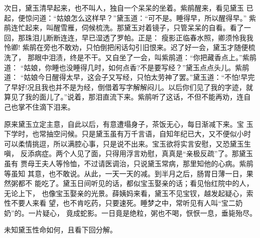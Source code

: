 次日，黛玉清早起来，也不叫人，独自一个呆呆的坐着。紫鹃醒来，看见黛玉
已起，便惊问道：“姑娘怎么这样早？”黛玉道：“可不是。睡得早，所以醒得早。”
紫鹃连忙起来，叫醒雪雁，伺候梳洗。那黛玉对着镜子，只管呆呆的自看。看了一
回，那珠泪儿断断连连，早已湿透了罗帕。正是：
瘦影正临春水照，卿须怜我我怜卿!
紫鹃在旁也不敢劝，只怕倒把闲话勾引旧恨来。迟了好一会，黛玉才随便梳洗了，
那眼中泪渍，终是不干。又自坐了一会，叫紫鹃道：“你把藏香点上。”紫鹃道：
“姑娘，你睡也没睡得几时，如何点香?不是要写经？”黛玉点点头儿。紫鹃道：
“姑娘今日醒得太早，这会子又写经，只怕太劳神了罢。”黛玉道：“不怕!早完
了早好!况且我也并不是为经，倒借着写字解解闷儿。以后你们见了我的字迹，就
算见了我的面儿了。”说着，那泪直流下来。紫鹃听了这话，不但不能再劝，连自
己也掌不住滴下泪来。

原来黛玉立定主意，自此以后，有意遭塌身子，茶饭无心，每日渐减下来。宝
玉下学时，也常抽空问候。只是黛玉虽有万千言语，自知年纪已大，又不便似小时
可以柔情挑逗，所以满腔心事，只是说不出来。宝玉欲将实言安慰，又恐黛玉生嗔，
反添病症。两个人见了面，只得用浮言劝慰，真真是“亲极反疏”了。那黛玉虽有
贾母王夫人等怜恤，不过请医调治，只说黛玉常病，那里知他的心病。紫鹃等虽知
其意，也不敢说。从此，一天一天的减。到半月之后，肠胃日薄一日，果然粥都不
能吃了。黛玉日间听见的话，都似宝玉娶亲的话；看见怡红院中的人，无论上下，
也像宝玉娶亲的光景。薛姨妈来看，黛玉不见宝钗，越发起疑心，索性不要人来看
望，也不肯吃药，只要速死。睡梦之中，常听见有人叫“宝二奶奶”的。一片疑心，
竟成蛇影。一日竟是绝粒，粥也不喝，恹恹一息，垂毙殆尽。

未知黛玉性命如何，且看下回分解。